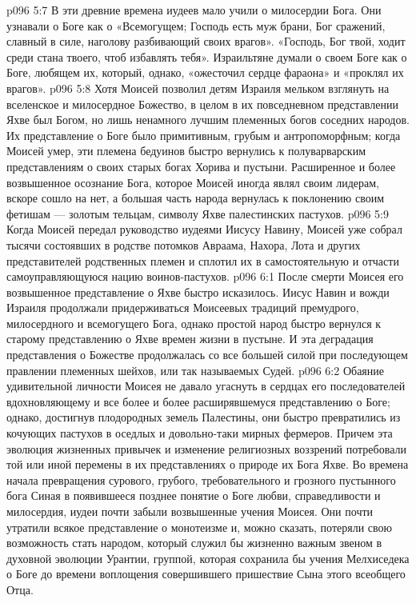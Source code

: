 \vs p096 5:7 В эти древние времена иудеев мало учили о милосердии Бога. Они узнавали о Боге как о «Всемогущем; Господь есть муж брани, Бог сражений, славный в силе, наголову разбивающий своих врагов». «Господь, Бог твой, ходит среди стана твоего, чтоб избавлять тебя». Израильтяне думали о своем Боге как о Боге, любящем их, который, однако, «ожесточил сердце фараона» и «проклял их врагов».
\vs p096 5:8 Хотя Моисей позволил детям Израиля мельком взглянуть на вселенское и милосердное Божество, в целом в их повседневном представлении Яхве был Богом, но лишь ненамного лучшим племенных богов соседних народов. Их представление о Боге было примитивным, грубым и антропоморфным; когда Моисей умер, эти племена бедуинов быстро вернулись к полуварварским представлениям о своих старых богах Хорива и пустыни. Расширенное и более возвышенное осознание Бога, которое Моисей иногда являл своим лидерам, вскоре сошло на нет, а большая часть народа вернулась к поклонению своим фетишам --- золотым тельцам, символу Яхве палестинских пастухов.
\vs p096 5:9 \pc Когда Моисей передал руководство иудеями Иисусу Навину, Моисей уже собрал тысячи состоявших в родстве потомков Авраама, Нахора, Лота и других представителей родственных племен и сплотил их в самостоятельную и отчасти самоуправляющуюся нацию воинов\hyp{}пастухов.
\vs p096 6:1 После смерти Моисея его возвышенное представление о Яхве быстро исказилось. Иисус Навин и вожди Израиля продолжали придерживаться Моисеевых традиций премудрого, милосердного и всемогущего Бога, однако простой народ быстро вернулся к старому представлению о Яхве времен жизни в пустыне. И эта деградация представления о Божестве продолжалась со все большей силой при последующем правлении племенных шейхов, или так называемых Судей.
\vs p096 6:2 Обаяние удивительной личности Моисея не давало угаснуть в сердцах его последователей вдохновляющему и все более и более расширявшемуся представлению о Боге; однако, достигнув плодородных земель Палестины, они быстро превратились из кочующих пастухов в оседлых и довольно\hyp{}таки мирных фермеров. Причем эта эволюция жизненных привычек и изменение религиозных воззрений потребовали той или иной перемены в их представлениях о природе их Бога Яхве. Во времена начала превращения сурового, грубого, требовательного и грозного пустынного бога Синая в появившееся позднее понятие о Боге любви, справедливости и милосердия, иудеи почти забыли возвышенные учения Моисея. Они почти утратили всякое представление о монотеизме и, можно сказать, потеряли свою возможность стать народом, который служил бы жизненно важным звеном в духовной эволюции Урантии, группой, которая сохранила бы учения Мелхиседека о Боге до времени воплощения совершившего пришествие Сына этого всеобщего Отца.
